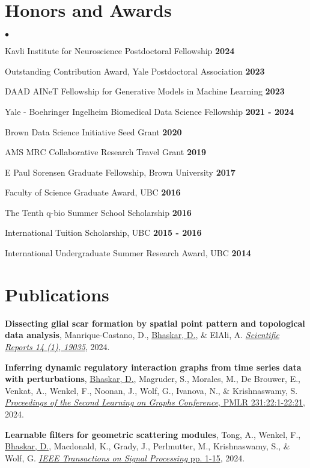 \documentclass[margin,line]{res}
\newenvironment{list2}{
  \begin{list}{$\bullet$}{
      \setlength{\itemsep}{0in}
      \setlength{\parsep}{0in} \setlength{\parskip}{0in}
      \setlength{\topsep}{0in} \setlength{\partopsep}{0in}
      \setlength{\leftmargin}{0.2in}}}{\end{list}}
\begin{document}
\begin{resume}
\vspace*{.12cm}

\section{\sc Honors and Awards}
\begin{list2}
\setlength\itemsep{0.25em}
\item Kavli Institute for Neuroscience Postdoctoral Fellowship \hfill {\bf 2024}
\item Outstanding Contribution Award, Yale Postdoctoral Association \hfill {\bf 2023}
\item DAAD AINeT Fellowship for Generative Models in Machine Learning \hfill {\bf 2023}
\item Yale - Boehringer Ingelheim Biomedical Data Science Fellowship \hfill {\bf 2021 - 2024}
\item Brown Data Science Initiative Seed Grant \hfill {\bf 2020}
\item AMS MRC Collaborative Research Travel Grant \hfill {\bf 2019}
\item E Paul Sorensen Graduate Fellowship, Brown University \hfill {\bf 2017}
\item Faculty of Science Graduate Award, UBC \hfill {\bf 2016}
\item The Tenth q-bio Summer School Scholarship \hfill {\bf 2016}
\item International Tuition Scholarship, UBC \hfill {\bf 2015 - 2016}
\item International Undergraduate Summer Research Award, UBC \hfill {\bf 2014}
\end{list2}

\section{\sc Publications}
{
\renewcommand\leftmargini{0em}
\begin{etaremune}[start=19]
\item{\bf Dissecting glial scar formation by spatial point pattern and topological data analysis},
Manrique-Castano, D., \underline{Bhaskar, D.}, \& ElAli, A. 
\href{https://doi.org/10.1038/s41598-024-69426-z}{\textit{Scientific Reports 14 (1), 19035}}, 2024.
\item{\bf Inferring dynamic regulatory interaction graphs from time series data with perturbations},
\underline{Bhaskar, D.}, Magruder, S., Morales, M., De Brouwer, E., Venkat, A., Wenkel, F., Noonan, J., Wolf, G., Ivanova, N., \& Krishnaswamy, S.
\href{https://proceedings.mlr.press/v231/bhaskar24a}{\textit{Proceedings of the Second Learning on Graphs Conference}, PMLR 231:22:1-22:21}, 2024.
\item{\bf Learnable filters for geometric scattering modules},
Tong, A., Wenkel, F., \underline{Bhaskar, D.}, Macdonald, K., Grady, J., Perlmutter, M., Krishnaswamy, S., \& Wolf, G.
\href{https://doi.org/10.1109/TSP.2024.3378001}{\textit{IEEE Transactions on Signal Processing} pp. 1-15}, 2024.
\end{etaremune}
} 


\end{resume}
\end{document}
